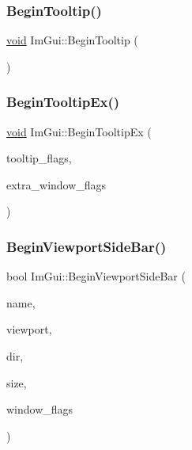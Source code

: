 \subsubsection{\texorpdfstring{Begin\+Tooltip()}{BeginTooltip()}}
{\footnotesize\ttfamily \hyperlink{imgui__impl__opengl3__loader_8h_ac668e7cffd9e2e9cfee428b9b2f34fa7}{void} Im\+Gui\+::\+Begin\+Tooltip (\begin{DoxyParamCaption}{ }\end{DoxyParamCaption})}

\mbox{\label{namespaceImGui_a8c9492bbbba890c77f7b3b7a95933879}} 
\subsubsection{\texorpdfstring{Begin\+Tooltip\+Ex()}{BeginTooltipEx()}}
{\footnotesize\ttfamily \hyperlink{imgui__impl__opengl3__loader_8h_ac668e7cffd9e2e9cfee428b9b2f34fa7}{void} Im\+Gui\+::\+Begin\+Tooltip\+Ex (\begin{DoxyParamCaption}\item[{\hyperlink{imgui__internal_8h_ad3bdaebce9ed8c9ce2f572ac419ffb71}{Im\+Gui\+Tooltip\+Flags}}]{tooltip\+\_\+flags,  }\item[{Im\+Gui\+Window\+Flags}]{extra\+\_\+window\+\_\+flags }\end{DoxyParamCaption})}

\mbox{\label{namespaceImGui_a4216382dd5ad6c17e183f9f894db2e15}} 
\subsubsection{\texorpdfstring{Begin\+Viewport\+Side\+Bar()}{BeginViewportSideBar()}}
{\footnotesize\ttfamily bool Im\+Gui\+::\+Begin\+Viewport\+Side\+Bar (\begin{DoxyParamCaption}\item[{const char $\ast$}]{name,  }\item[{\hyperlink{structImGuiViewport}{Im\+Gui\+Viewport} $\ast$}]{viewport,  }\item[{Im\+Gui\+Dir}]{dir,  }\item[{float}]{size,  }\item[{Im\+Gui\+Window\+Flags}]{window\+\_\+flags }\end{DoxyParamCaption})}

